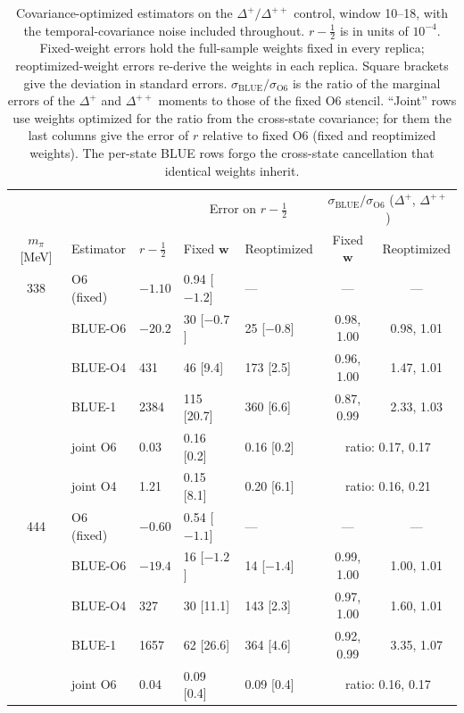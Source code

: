 \documentclass[aps,prd,reprint,twocolumn,superscriptaddress,nofootinbib,longbibliography]{revtex4-2}
\begin{document}
\begin{table}[t]
\caption{Covariance-optimized estimators on the $\Delta^+/\Delta^{++}$ control, window 10--18, with the temporal-covariance noise included throughout. $r-\tfrac12$ is in units of $10^{-4}$. Fixed-weight errors hold the full-sample weights fixed in every replica; reoptimized-weight errors re-derive the weights in each replica. Square brackets give the deviation in standard errors. $\sigma_\mathrm{BLUE}/\sigma_\mathrm{O6}$ is the ratio of the marginal errors of the $\Delta^+$ and $\Delta^{++}$ moments to those of the fixed O6 stencil. ``Joint'' rows use weights optimized for the ratio from the cross-state covariance; for them the last columns give the error of $r$ relative to fixed O6 (fixed and reoptimized weights). The per-state BLUE rows forgo the cross-state cancellation that identical weights inherit.}
\label{tab:decupletblue}
\centering
\setlength{\tabcolsep}{6pt}\begin{tabular}{cllllcc}
\toprule
& & & \multicolumn{2}{c}{Error on $r-\tfrac12$} & \multicolumn{2}{c}{$\sigma_\mathrm{BLUE}/\sigma_\mathrm{O6}$ ($\Delta^+$, $\Delta^{++}$)}\\
$m_\pi$ [MeV] & Estimator & $r-\tfrac12$ & Fixed $\bm w$ & Reoptimized & Fixed $\bm w$ & Reoptimized\\
\midrule
338 & O6 (fixed) & $-1.10$ & 0.94 [$-1.2$] & --- & --- & ---\\
    & BLUE-O6 & $-20.2$ & 30 [$-0.7$] & 25 [$-0.8$] & 0.98, 1.00 & 0.98, 1.01\\
    & BLUE-O4 & 431 & 46 [9.4] & 173 [2.5] & 0.96, 1.00 & 1.47, 1.01\\
    & BLUE-1 & 2384 & 115 [20.7] & 360 [6.6] & 0.87, 0.99 & 2.33, 1.03\\
    & joint O6 & 0.03 & 0.16 [0.2] & 0.16 [0.2] & \multicolumn{2}{c}{ratio: 0.17, 0.17}\\
    & joint O4 & 1.21 & 0.15 [8.1] & 0.20 [6.1] & \multicolumn{2}{c}{ratio: 0.16, 0.21}\\
\midrule
444 & O6 (fixed) & $-0.60$ & 0.54 [$-1.1$] & --- & --- & ---\\
    & BLUE-O6 & $-19.4$ & 16 [$-1.2$] & 14 [$-1.4$] & 0.99, 1.00 & 1.00, 1.01\\
    & BLUE-O4 & 327 & 30 [11.1] & 143 [2.3] & 0.97, 1.00 & 1.60, 1.01\\
    & BLUE-1 & 1657 & 62 [26.6] & 364 [4.6] & 0.92, 0.99 & 3.35, 1.07\\
    & joint O6 & 0.04 & 0.09 [0.4] & 0.09 [0.4] & \multicolumn{2}{c}{ratio: 0.16, 0.17}\\

\end{tabular}
\end{table}
\end{document}
